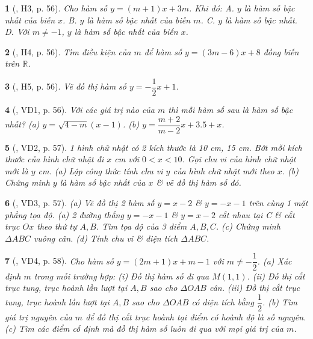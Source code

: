 \documentclass{article}
\newtheorem{baitoan}{}
\begin{document}
\begin{baitoan}[\cite{Binh_boi_duong_Toan_9_tap_1}, H3, p. 56]
	Cho hàm số $y = (m + 1)x + 3m$. Khi đó: {\sf A.} $y$ là hàm số bậc nhất của biến $x$. {\sf B.} $y$ là hàm số bậc nhất của biến $m$. {\sf C.} $y$ là hàm số bậc nhất. {\sf D.} Với $m\ne-1$, $y$ là hàm số bậc nhất của biến $x$.
\end{baitoan}

\begin{baitoan}[\cite{Binh_boi_duong_Toan_9_tap_1}, H4, p. 56]
	Tìm điều kiện của $m$ để hàm số $y = (3m - 6)x + 8$ đồng biến trên $\mathbb{R}$.
\end{baitoan}

\begin{baitoan}[\cite{Binh_boi_duong_Toan_9_tap_1}, H5, p. 56]
	Vẽ đồ thị hàm số $y = -\dfrac{1}{2}x + 1$.
\end{baitoan}

\begin{baitoan}[\cite{Binh_boi_duong_Toan_9_tap_1}, VD1, p. 56]
	Với các giá trị nào của $m$ thì mỗi hàm số sau là hàm số bậc nhất? (a) $y = \sqrt{4 - m}(x - 1)$. (b) $y = \dfrac{m + 2}{m - 2}x + 3.5 + x$.
\end{baitoan}

\begin{baitoan}[\cite{Binh_boi_duong_Toan_9_tap_1}, VD2, p. 57]
	1 hình chữ nhật có 2 kích thước là {\rm10 cm, 15 cm}. Bớt mỗi kích thước của hình chữ nhật đi $x$ {\rm cm} với $0 < x < 10$. Gọi chu vi của hình chữ nhật mới là $y$ {\rm cm}. (a) Lập công thức tính chu vi $y$ của hình chữ nhật mới theo $x$. (b) Chứng minh $y$ là hàm số bậc nhất của $x$ \& vẽ đồ thị hàm số đó.
\end{baitoan}

\begin{baitoan}[\cite{Binh_boi_duong_Toan_9_tap_1}, VD3, p. 57]
	(a) Vẽ đồ thị 2 hàm số $y = x - 2$ \& $y = -x - 1$ trên cùng 1 mặt phẳng tọa độ. (a) 2 đường thẳng $y = -x - 1$ \& $y = x - 2$ cắt nhau tại C \& cắt trục $Ox$ theo thứ tự $A,B$. Tìm tọa độ của 3 điểm $A,B,C$. (c) Chứng minh $\Delta ABC$ vuông cân. (d) Tính chu vi \& diện tích $\Delta ABC$.
\end{baitoan}

\begin{baitoan}[\cite{Binh_boi_duong_Toan_9_tap_1}, VD4, p. 58]
	Cho hàm số $y = (2m + 1)x + m - 1$ với $m\ne-\dfrac{1}{2}$. (a) Xác định $m$ trong mỗi trường hợp: (i) Đồ thị hàm số đi qua $M(1,1)$. (ii) Đồ thị cắt trục tung, trục hoành lần lượt tại $A,B$ sao cho $\Delta OAB$ cân. (iii) Đồ thị cắt trục tung, trục hoành lần lượt tại $A,B$ sao cho $\Delta OAB$ có diện tích bằng $\dfrac{1}{2}$. (b) Tìm giá trị nguyên của $m$ để đồ thị cắt trục hoành tại điểm có hoành độ là số nguyên. (c) Tìm các điểm cố định mà đồ thị hàm số luôn đi qua với mọi giá trị của $m$.
\end{baitoan}
\end{document}
